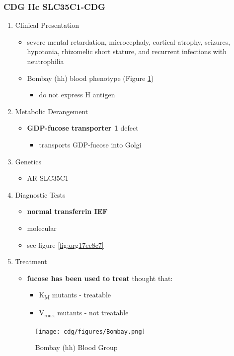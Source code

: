 \documentclass[12pt]{scrartcl}
\begin{document}
\subsubsection{CDG IIc SLC35C1-CDG}
\label{sec:org9559e3a}
\begin{enumerate}
\item Clinical Presentation
\label{sec:org03d750d}
\begin{itemize}
\item severe mental retardation, microcephaly, cortical atrophy, seizures,
hypotonia, rhizomelic short stature, and recurrent infections with
neutrophilia
\item Bombay (hh) blood phenotype (Figure \ref{fig:org49c0bba})
\begin{itemize}
\item do not express H antigen
\end{itemize}
\end{itemize}
\item Metabolic Derangement
\label{sec:orgd3ce7df}
\begin{itemize}
\item \textbf{GDP-fucose transporter 1} defect
\begin{itemize}
\item transports GDP-fucose into Golgi
\end{itemize}
\end{itemize}
\item Genetics
\label{sec:org58302de}
\begin{itemize}
\item AR SLC35C1
\end{itemize}

\item Diagnostic Tests
\label{sec:orgb24361b}
\begin{itemize}
\item \textbf{normal transferrin IEF}
\item molecular
\item see figure \ref{fig:org17ec8c7}
\end{itemize}
\item Treatment
\label{sec:org1b05eac}
\begin{itemize}
\item \textbf{fucose has been used to treat} thought that:
\begin{itemize}
\item K\textsubscript{M} mutants - treatable
\item V\textsubscript{max} mutants - not treatable
\end{itemize}
\end{itemize}

\begin{figure}[htbp]
\centering
\texttt{[image: cdg/figures/Bombay.png]}
\caption[Hh]{\label{fig:org49c0bba}Bombay (hh) Blood Group}
\end{figure}
\end{enumerate}
\end{document}
